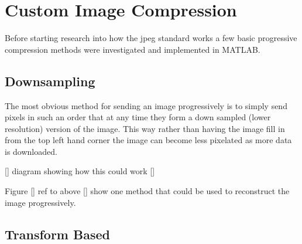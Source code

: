 \section{Custom Image Compression}
\label{Custom_comp_research}

Before starting research into how the jpeg standard works a few basic progressive compression methods were investigated and implemented in MATLAB.

\subsection{Downsampling}

The most obvious method for sending an image progressively is to simply send pixels in such an order that at any time they form a down sampled (lower resolution) version of the image. This way rather than having the image fill in from the top left hand corner the image can become less pixelated as more data is downloaded.

[] diagram showing how this could work []

Figure [] ref to above [] show one method that could be used to reconstruct the image progressively.

\subsection{Transform Based}

